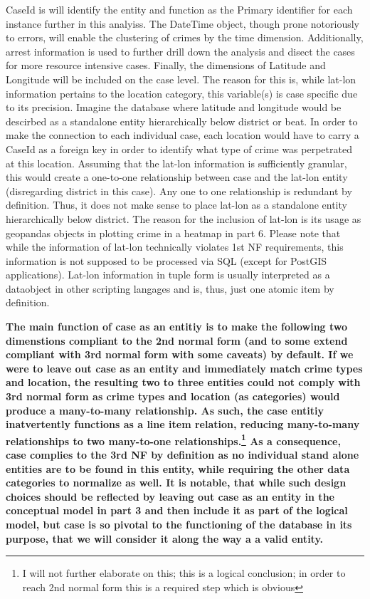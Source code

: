 \documentclass[a4paper]{article}
\begin{document}
CaseId is will identify the entity and function as the Primary identifier for each instance further in this analyiss. The DateTime object, though prone notoriously to errors, will enable the clustering of crimes by the time dimension. Additionally, arrest information is used to further drill down the analysis and disect the cases for more resource intensive cases. Finally, the dimensions of Latitude and Longitude will be included on the case level. The reason for this is, while lat-lon information pertains to the location category, this variable(s) is case specific due to its precision. Imagine the database where latitude and longitude would be descirbed as a standalone entity hierarchically below district or beat. In order to make the connection to each individual case, each location would have to carry a CaseId as a foreign key in order to identify what type of crime was perpetrated at this location. Assuming that the lat-lon information is sufficiently granular, this would create a one-to-one relationship between case and the lat-lon entity (disregarding district in this case). Any one to one relationship is redundant by definition. Thus, it does not make sense to place lat-lon as a standalone entity hierarchically below district. The reason for the inclusion of lat-lon is its usage as geopandas objects in plotting crime in a heatmap in part 6. Please note that while the information of lat-lon technically violates 1st NF requirements, this information is not supposed to be processed via SQL (except for PostGIS applications). Lat-lon information in tuple form is usually interpreted as a dataobject in other scripting langages and is, thus, just one atomic item by definition.

\textbf{The main function of case as an entitiy is to make the following two dimenstions compliant to the 2nd normal form (and to some extend compliant with 3rd normal form with some caveats) by default. If we were to leave out case as an entity and immediately match crime types and location, the resulting two to three entities could not comply with 3rd normal form as crime types and location (as categories) would produce a many-to-many relationship. As such, the case entitiy inatvertently functions as a line item relation, reducing many-to-many relationships to two many-to-one relationships.\footnote{I will not further elaborate on this; this is a logical conclusion; in order to reach 2nd normal form this is a required step which is obvious} As a consequence, case complies to the 3rd NF by definition as no individual stand alone entities are to be found in this entity, while requiring the other data categories to normalize as well. It is notable, that while such design choices should be reflected by leaving out case as an entity in the conceptual model in part 3 and then include it as part of the logical model, but case is so pivotal to the functioning of the database in its purpose, that we will consider it along the way a a valid entity.}
\end{document}
